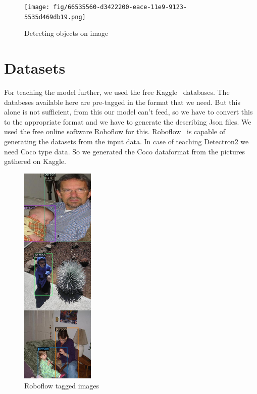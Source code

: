 \begin{figure}[!ht]
\centering
\texttt{[image: fig/66535560-d3422200-eace-11e9-9123-5535d469db19.png]}
\caption{Detecting objects on image\cite{detectron2}}
\label{fig:det2} 
\end{figure}

\section{Datasets}
For teaching the model further, we used the free Kaggle~\cite{kaggle} databases. The databeses available here are pre-tagged in the format that we need. But this alone is not sufficient, from this our model can’t feed, so we have to convert this to the appropriate format and we have to generate the describing Json files. We used the free online software Roboflow for this. Roboflow~\cite{roboflow} is capable of generating the datasets from the input data. In case of teaching Detectron2 we need Coco type data. So we generated the Coco dataformat from the pictures gathered on Kaggle.

\begin{figure}[!ht]
\centering
\includegraphics[width=35mm,keepaspectratio]{fig/roboflow_image.png}
\caption{Roboflow tagged images}
\label{fig:roboflow} 
\end{figure}

